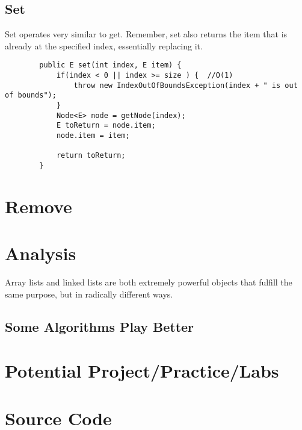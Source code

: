 	
	\subsection{Set}
	
	Set operates very similar to get.  Remember, set also returns the item that is already at the specified index, essentially replacing it.
	
	\begin{verbatim}
		public E set(int index, E item) {
			if(index < 0 || index >= size ) {  //O(1)
				throw new IndexOutOfBoundsException(index + " is out of bounds");
			}
			Node<E> node = getNode(index);
			E toReturn = node.item;
			node.item = item;
			
			return toReturn;
		}
	\end{verbatim}
	
	
	\section{Remove}
	
	
	
	
	\section{Analysis}
	Array lists and linked lists are both extremely powerful objects that fulfill  the same purpose, but in radically different ways. 
	
	
	
	
	\subsection{Some Algorithms Play Better}
	
	\section{Potential Project/Practice/Labs}
	
	\section{Source Code}
	\inputminted{python3}{code/linkedlist.py}
